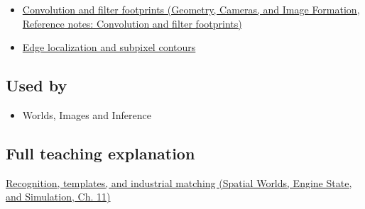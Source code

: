 \begin{itemize}
\tightlist
\item
  \href{../03-Geometry-Cameras-and-Image-Formation/main.pdf\#nameddest=appendix-d5b3c692d9f0}{Convolution and filter footprints (Geometry, Cameras, and Image Formation, Reference notes: Convolution and filter footprints)}
\item
  \hyperref[appendix-36022286b03e]{Edge localization and subpixel contours}
\end{itemize}

\subsection{Used by}\label{appendix-5fb4af80d1c7-used-by}

\hypertarget{appendix-5fb4af80d1c7-used-by}{}

\begin{itemize}
\tightlist
\item
  {Worlds, Images and Inference}
\end{itemize}

\subsection{Full teaching explanation}\label{appendix-5fb4af80d1c7-full-teaching-explanation}

\hypertarget{appendix-5fb4af80d1c7-full-teaching-explanation}{}

\href{../05-Spatial-Worlds-Engine-State-and-Simulation/main.pdf\#nameddest=04-visual-computing-ii-ch030-recognition-templates-and-industrial-matching}{Recognition, templates, and industrial matching (Spatial Worlds, Engine State, and Simulation, Ch. 11)}
